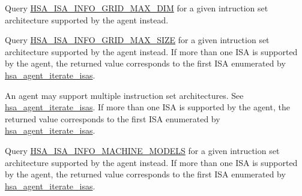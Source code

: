 \begin{DoxyRefList}
%
Query \mbox{\hyperlink{group__instruction-set-architecture_ggaa8a09719dffad53bb3908b11ed25c1e4a74d19d354befd5137d1fa9b76fb65701}{HSA\+\_\+\+ISA\+\_\+\+INFO\+\_\+\+GRID\+\_\+\+MAX\+\_\+\+DIM}} for a given intruction set architecture supported by the agent instead. 
\item[Member \mbox{\hyperlink{group__agentinfo_gga39d0684207d95717d96319573b3e4a42a16cd0e9d2e75ee3db1c22738b2cad8f6}{HSA\+\_\+\+AGENT\+\_\+\+INFO\+\_\+\+GRID\+\_\+\+MAX\+\_\+\+SIZE}} ]\label{deprecated__deprecated000068}%
%
Query \mbox{\hyperlink{group__instruction-set-architecture_ggaa8a09719dffad53bb3908b11ed25c1e4a10539ad11e71308ad3e2e47237233cb6}{HSA\+\_\+\+ISA\+\_\+\+INFO\+\_\+\+GRID\+\_\+\+MAX\+\_\+\+SIZE}} for a given intruction set architecture supported by the agent instead. If more than one ISA is supported by the agent, the returned value corresponds to the first ISA enumerated by \mbox{\hyperlink{group__instruction-set-architecture_gaa624c390f2cfec064bc1b4d9c9303ed4}{hsa\+\_\+agent\+\_\+iterate\+\_\+isas}}. 
\item[Member \mbox{\hyperlink{group__agentinfo_gga39d0684207d95717d96319573b3e4a42a10ffd1f47f50e9b76d1b411c24ad9267}{HSA\+\_\+\+AGENT\+\_\+\+INFO\+\_\+\+ISA}} ]\label{deprecated__deprecated000073}%
%
An agent may support multiple instruction set architectures. See \mbox{\hyperlink{group__instruction-set-architecture_gaa624c390f2cfec064bc1b4d9c9303ed4}{hsa\+\_\+agent\+\_\+iterate\+\_\+isas}}. If more than one ISA is supported by the agent, the returned value corresponds to the first ISA enumerated by \mbox{\hyperlink{group__instruction-set-architecture_gaa624c390f2cfec064bc1b4d9c9303ed4}{hsa\+\_\+agent\+\_\+iterate\+\_\+isas}}. 
\item[Member \mbox{\hyperlink{group__agentinfo_gga39d0684207d95717d96319573b3e4a42a5f62c238148161421e91c90552a39f46}{HSA\+\_\+\+AGENT\+\_\+\+INFO\+\_\+\+MACHINE\+\_\+\+MODEL}} ]\label{deprecated__deprecated000059}%
%
Query \mbox{\hyperlink{group__instruction-set-architecture_ggaa8a09719dffad53bb3908b11ed25c1e4a4c6576d085e48f922da100f01ed6b1ef}{HSA\+\_\+\+ISA\+\_\+\+INFO\+\_\+\+MACHINE\+\_\+\+MODELS}} for a given intruction set architecture supported by the agent instead. If more than one ISA is supported by the agent, the returned value corresponds to the first ISA enumerated by \mbox{\hyperlink{group__instruction-set-architecture_gaa624c390f2cfec064bc1b4d9c9303ed4}{hsa\+\_\+agent\+\_\+iterate\+\_\+isas}}. 

\end{DoxyRefList}
